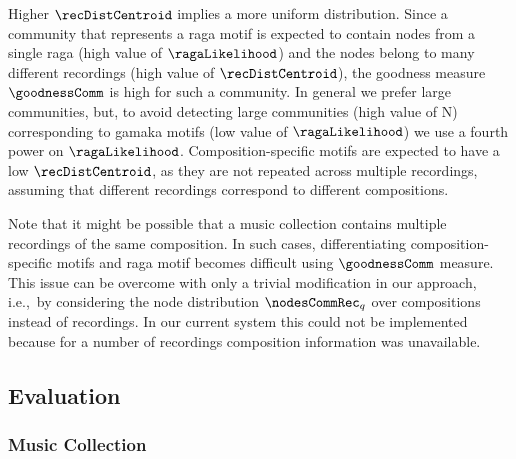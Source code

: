 {Higher $\recDistCentroid$ implies a more uniform distribution. Since a community that represents a \gls{raga} motif is expected to contain nodes from a single \gls{raga} (high value of $\ragaLikelihood$) and the nodes belong to many different recordings (high value of $\recDistCentroid$), the goodness measure $\goodnessComm$ is high for such a community. In general we prefer large communities, but, to avoid detecting large communities (high value of N) corresponding to \gls{gamaka} motifs (low value of $\ragaLikelihood$) we use a fourth power on $\ragaLikelihood$. Composition-specific motifs are expected to have a low $\recDistCentroid$, as they are not repeated across multiple recordings, assuming that different recordings correspond to different compositions. 

Note that it might be possible that a music collection contains multiple recordings of the same composition. In such cases, differentiating composition-specific motifs and \gls{raga} motif becomes difficult using $\goodnessComm$ measure. This issue can be overcome with only a trivial modification in our approach, i.e.,~by considering the node distribution ${{\nodesCommRec}_q}$ over compositions instead of recordings. In our current system this could not be implemented because for a number of recordings composition information was unavailable.



\subsection{Evaluation}
\label{sec:patterns_characterization_evaluation}

\subsubsection{Music Collection}
\label{sec:patterns_characterization_music_collection}

}
